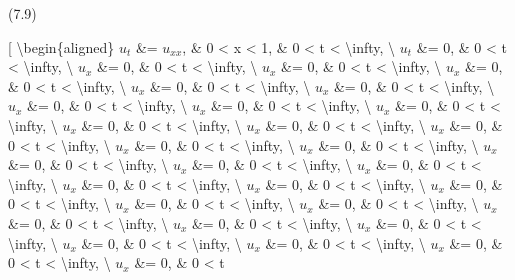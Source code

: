 \documentclass[
]{article}
\begin{document}
{{(7.9)

{[} \textbackslash begin\{aligned\} \(u_t\) \&= \(u_{xx}\), \& 0
\textless{} x \textless{} 1, \& 0 \textless{} t \textless{}
\textbackslash infty, \textbackslash{} \(u_t\) \&= 0, \& 0 \textless{} t
\textless{} \textbackslash infty, \textbackslash{} \(u_x\) \&= 0, \& 0
\textless{} t \textless{} \textbackslash infty, \textbackslash{} \(u_x\)
\&= 0, \& 0 \textless{} t \textless{} \textbackslash infty,
\textbackslash{} \(u_x\) \&= 0, \& 0 \textless{} t \textless{}
\textbackslash infty, \textbackslash{} \(u_x\) \&= 0, \& 0 \textless{} t
\textless{} \textbackslash infty, \textbackslash{} \(u_x\) \&= 0, \& 0
\textless{} t \textless{} \textbackslash infty, \textbackslash{} \(u_x\)
\&= 0, \& 0 \textless{} t \textless{} \textbackslash infty,
\textbackslash{} \(u_x\) \&= 0, \& 0 \textless{} t \textless{}
\textbackslash infty, \textbackslash{} \(u_x\) \&= 0, \& 0 \textless{} t
\textless{} \textbackslash infty, \textbackslash{} \(u_x\) \&= 0, \& 0
\textless{} t \textless{} \textbackslash infty, \textbackslash{} \(u_x\)
\&= 0, \& 0 \textless{} t \textless{} \textbackslash infty,
\textbackslash{} \(u_x\) \&= 0, \& 0 \textless{} t \textless{}
\textbackslash infty, \textbackslash{} \(u_x\) \&= 0, \& 0 \textless{} t
\textless{} \textbackslash infty, \textbackslash{} \(u_x\) \&= 0, \& 0
\textless{} t \textless{} \textbackslash infty, \textbackslash{} \(u_x\)
\&= 0, \& 0 \textless{} t \textless{} \textbackslash infty,
\textbackslash{} \(u_x\) \&= 0, \& 0 \textless{} t \textless{}
\textbackslash infty, \textbackslash{} \(u_x\) \&= 0, \& 0 \textless{} t
\textless{} \textbackslash infty, \textbackslash{} \(u_x\) \&= 0, \& 0
\textless{} t \textless{} \textbackslash infty, \textbackslash{} \(u_x\)
\&= 0, \& 0 \textless{} t \textless{} \textbackslash infty,
\textbackslash{} \(u_x\) \&= 0, \& 0 \textless{} t \textless{}
\textbackslash infty, \textbackslash{} \(u_x\) \&= 0, \& 0 \textless{} t
\textless{} \textbackslash infty, \textbackslash{} \(u_x\) \&= 0, \& 0
\textless{} t \textless{} \textbackslash infty, \textbackslash{} \(u_x\)
\&= 0, \& 0 \textless{} t \textless{} \textbackslash infty,
\textbackslash{} \(u_x\) \&= 0, \& 0 \textless{} t \textless{}
\textbackslash infty, \textbackslash{} \(u_x\) \&= 0, \& 0 \textless{} t
\textless{} \textbackslash infty, \textbackslash{} \(u_x\) \&= 0, \& 0
\textless{} t \textless{} \textbackslash infty, \textbackslash{} \(u_x\)
\&= 0, \& 0 \textless{} t \textless{} \textbackslash infty,
\textbackslash{} \(u_x\) \&= 0, \& 0 \textless{} t \textless{}
\textbackslash infty, \textbackslash{} \(u_x\) \&= 0, \& 0 \textless{} t
}}
\end{document}
